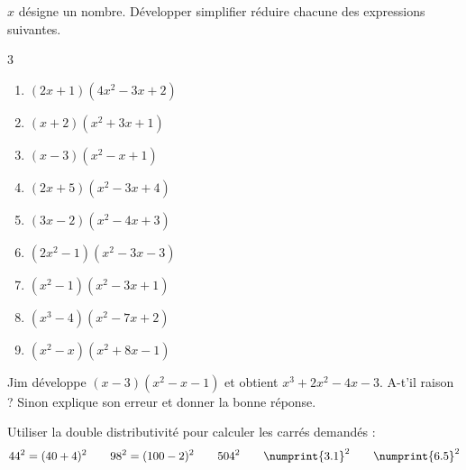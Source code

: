 \documentclass[main.tex]{subfiles}
\begin{document}
\begin{exercise}\label{chapter03:exercices:developper03} $x$ désigne un nombre.	Développer simplifier réduire chacune des expressions suivantes.
	\begin{multicols}{3} 
		\begin{enumerate}[label={$\Alph*(x)=$}, leftmargin=*] 
			\item $(2x+1)(4x^2-3x+2)$
			\item $(x+2)(x^2+3x+1)$
			\item $(x-3)(x^2-x+1)$ 
			\item $(2x+5)(x^2-3x+4)$ 
			\item $(3x-2)(x^2-4x+3)$ 
			\item $(2x^2-1)(x^2-3x-3)$ 
			\item $(x^2-1)(x^2-3x+1)$ 
			\item $(x^3-4)(x^2-7x+2)$ 
			\item $(x^2-x)(x^2+8x-1)$ 
		\end{enumerate}
	\end{multicols}
\end{exercise}
\begin{cBox}
	Jim développe $(x-3)(x^2-x-1)$ et obtient $x^3+2x^2-4x-3$. A-t'il raison ? Sinon explique son erreur et donner la bonne réponse.
\end{cBox}
\begin{exercise}[\cancel{\faCalculator}] Utiliser la double distributivité  pour calculer les carrés demandés :
	\[
	44^2=(40+4)^2\qquad 98^2=(100-2)^2 \qquad 504^2\qquad \numprint{3.1}^2\qquad \numprint{6.5}^2 
	\] 
\end{exercise}  
\end{document}
